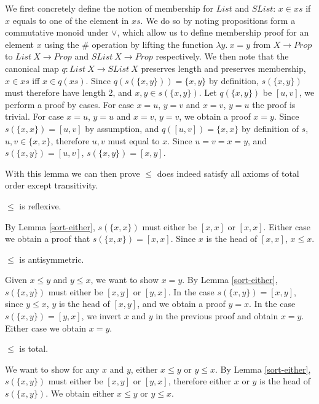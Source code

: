 \documentclass{article}
\begin{document}
We first concretely define the notion of membership for $List$ and $SList$: $x \in xs$ if $x$ equals to one of the element in $xs$.
We do so by noting propositions form a commutative monoid under $\vee$,
which allow us to define membership proof for an element $x$ using the $\#$ operation
by lifting the function $\lambda y. \: x = y$ from $X \rightarrow Prop$ to $List \: X \rightarrow Prop$ and $SList \: X \rightarrow Prop$ respectively.
We then note that the canonical map $q : List \: X \rightarrow SList \: X$ preserves length and preserves membership, $x \in xs$ iff $x \in q(xs)$.
Since $q(s(\{x, y\})) = \{x, y\}$ by definition, $s(\{x,y\})$ must therefore have length 2, and $x, y \in s(\{x, y\})$.
Let $q(\{x, y\})$ be $[u, v]$, we perform a proof by cases. For case $x = u$, $y = v$ and $x = v$, $y = u$ the proof is trivial.
For case $x = u$, $y = u$ and $x = v$, $y = v$, we obtain a proof $x = y$. Since $s(\{x, x\}) = [u , v]$ by assumption,
and $q([u, v]) = \{x, x\}$ by definition of $s$, $u, v \in \{x, x\}$, therefore $u, v$ must equal to $x$.
Since $u = v = x = y$, and $s(\{x, y\}) = [u, v]$, $s(\{x, y\}) = [x, y]$.

With this lemma we can then prove $\leq$ does indeed satisfy all axioms of total order except transitivity.

\begin{mythm}
    $\leq$ is reflexive.
\end{mythm}
    By Lemma \ref{sort-either}, $s(\{x, x\})$ must either be $[x, x]$ or $[x ,x]$. Either case we obtain a proof that
    $s(\{x, x\}) = [x, x]$. Since $x$ is the head of $[x, x]$, $x \leq x$.

\begin{mythm}
    $\leq$ is antisymmetric.
\end{mythm}
    Given $x \leq y$ and $y \leq x$, we want to show $x = y$.
    By Lemma \ref{sort-either}, $s(\{x, y\})$ must either be $[x, y]$ or $[y, x]$. In the case $s(\{x, y\}) = [x, y]$,
    since $y \leq x$, $y$ is the head of $[x, y]$, and we obtain a proof $y = x$. In the case $s(\{x, y\}) = [y, x]$,
    we invert $x$ and $y$ in the previous proof and obtain $x = y$. Either case we obtain $x = y$.

\begin{mythm}
    $\leq$ is total.
\end{mythm}
    We want to show for any $x$ and $y$, either $x \leq y$ or $y \leq x$.
    By Lemma \ref{sort-either}, $s(\{x, y\})$ must either be $[x, y]$ or $[y, x]$, therefore either $x$ or $y$
    is the head of $s(\{x, y\})$. We obtain either $x \leq y$ or $y \leq x$.
\end{document}
